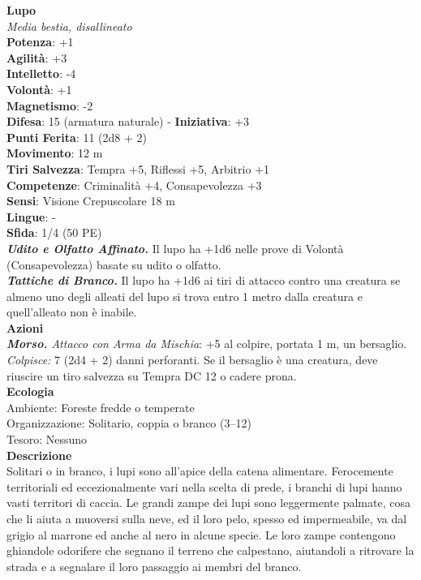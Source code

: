 \begin{multicols}{2}
\medskip\textbf{Lupo}\\
\emph{Media bestia, disallineato}\\
\textbf{Potenza}: +1\\
\textbf{Agilità}: +3\\
\textbf{Intelletto}: -4\\
\textbf{Volontà}: +1\\
\textbf{Magnetismo}: -2\\
\textbf{Difesa}: 15 (armatura naturale) - \textbf{Iniziativa}: +3\\
\textbf{Punti Ferita}: 11 (2d8 + 2)\\
\textbf{Movimento}: 12 m\\
\textbf{Tiri Salvezza}: Tempra +5, Riflessi +5, Arbitrio +1 \\
\textbf{Competenze}: Criminalità +4, Consapevolezza +3\\
\textbf{Sensi}: Visione Crepuscolare 18 m\\
\textbf{Lingue}: -\\
\textbf{Sfida}: 1/4 (50 PE)\smallskip\\
\emph{\textbf{Udito e Olfatto Affinato.}} Il lupo ha +1d6 nelle prove di Volontà (Consapevolezza) basate su udito o olfatto.\\
\emph{\textbf{Tattiche di Branco.}} Il lupo ha +1d6 ai tiri di attacco contro una creatura se almeno uno degli alleati del lupo si trova entro 1 metro dalla creatura e quell'alleato non è inabile.\\
\smallskip\textbf{Azioni}\\
\emph{\textbf{Morso.} Attacco con Arma da Mischia}: +5 al colpire, portata 1 m, un bersaglio.\\

\emph{Colpisce:} 7 (2d4 + 2) danni perforanti. Se il bersaglio è una creatura, deve riuscire un tiro salvezza su Tempra DC  12 o cadere prona.\\
\textbf{Ecologia}\\
Ambiente: Foreste fredde o temperate\\
Organizzazione: Solitario, coppia o branco (3–12)\\
Tesoro: Nessuno\\
\textbf{Descrizione}\\

Solitari o in branco, i lupi sono all’apice della catena alimentare. Ferocemente territoriali ed eccezionalmente vari nella scelta di prede, i branchi di lupi hanno vasti territori di caccia. Le grandi zampe dei lupi sono leggermente palmate, cosa che li aiuta a muoversi sulla neve, ed il loro pelo, spesso ed impermeabile, va dal grigio al marrone ed anche al nero in alcune specie. Le loro zampe contengono ghiandole odorifere che segnano il terreno che calpestano, aiutandoli a ritrovare la strada e a segnalare il loro passaggio ai membri del branco.\\


\end{multicols}
